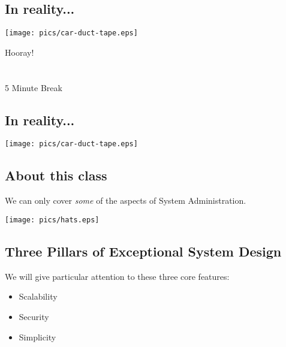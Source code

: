 \documentclass[xga]{xdvislides}
\begin{document}
\subsection{In reality...}
\vspace*{\fill}
\begin{center}
    \texttt{[image: pics/car-duct-tape.eps]}
\end{center}
\vspace*{\fill}

\newpage
\vspace*{\fill}
\begin{center}
    \Hugesize
        Hooray! \\ [1em]
    \hspace*{5mm}
    \blueline\\
    \hspace*{5mm}\\
        5 Minute Break
\end{center}
\vspace*{\fill}

\subsection{In reality...}
\vspace*{\fill}
\begin{center}
    \texttt{[image: pics/car-duct-tape.eps]}
\end{center}
\vspace*{\fill}

\subsection{About this class}
We can only cover {\em some} of the aspects of System Administration.
\vspace*{\fill}
\begin{center}
	\texttt{[image: pics/hats.eps]}
\Normalsize
\end{center}
\vspace*{\fill}

\subsection{Three Pillars of Exceptional System Design}
We will give particular attention to these three core features:
\begin{itemize}
	\item Scalability
	\item Security
	\item Simplicity
\end{itemize}
\end{document}
